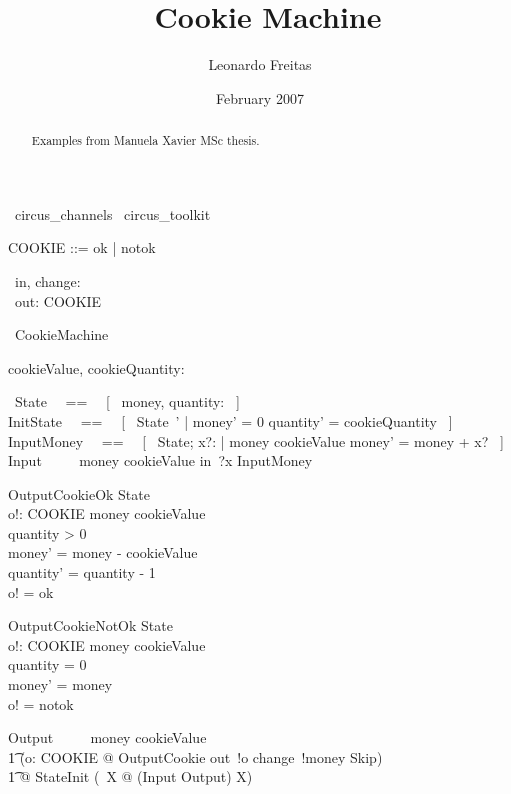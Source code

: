 \documentclass{article}
\begin{document}
\title{\Circus\ Cookie Machine}
\author{Leonardo Freitas}
\date{February 2007}

\maketitle

\begin{abstract}
    \noindent Examples from Manuela Xavier MSc thesis.
\end{abstract}

\begin{zsection}
  \SECTION\ circus\_channels \parents\ circus\_toolkit
\end{zsection}

\begin{zed}
   COOKIE ::= ok | notok
\end{zed}

\begin{circus}
   \circchannel\ in, change: \nat \\
   \circchannel\ out: COOKIE
\end{circus}

\begin{circus}
    \circprocess\ CookieMachine \circdef \circbegin
    \also %
    \begin{axdef}
       cookieValue, cookieQuantity: \nat
    \end{axdef}
    \circstate\ State ~~==~~ [~ money, quantity: \nat ~] \\
    InitState ~~==~~ [~ State~' | money' = 0 \land quantity' = cookieQuantity ~] \\
    InputMoney ~~==~~ [~ \Delta State; x?: \net | money \leq cookieValue \land money' = money + x? ~] \\
    Input ~~\circdef~~ money \leq cookieValue \circquard in~?x \circthen InputMoney \\
    \begin{schema}{OutputCookieOk}
        \Delta State \\
        o!: COOKIE
    \where
        money \geq cookieValue \\
        quantity > 0 \\
        money' = money - cookieValue \\
        quantity' = quantity - 1 \\
        o! = ok
    \end{schema}
    \begin{schema}{OutputCookieNotOk}
        \Delta State \\
        o!: COOKIE
    \where
        money \geq cookieValue \\
        quantity = 0 \\
        money' = money \\
        o! = notok
    \end{schema}
    Output ~~\circdef~~ money \geq cookieValue \circvar \\
        \t1 (\circvar o: COOKIE @ OutputCookie \circseq out~!o \circthen change~!money \circthen Skip) \\
    \t1 @ StateInit \circseq (\circmu\ X @ (Input \extchoice Output) \circseq X) \\
   \circend
\end{circus}
\end{document}
